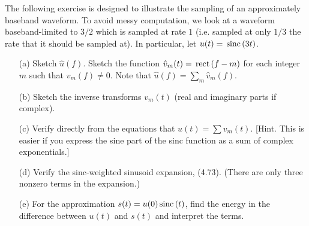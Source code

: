 \documentclass{assignment}
\begin{document}
\begin{prob}[4.35 Aliasing]
    The following exercise is designed to illustrate the sampling of an approximately baseband waveform. To avoid messy computation, we look at a waveform baseband-limited to $3/2$ which is sampled at rate $1$ (i.e. sampled at only $1/3$ the rate that it should be sampled at). In particular, let $u(t)=\,\text{sinc}\,(3t)$.
    \begin{itemize}
        \item[(a)] Sketch $\hat{u}(f)$. Sketch the function $\hat{v}_m(t)=\,\text{rect}\,(f-m)$ for each integer $m$ such that $v_m(f)\neq 0$. Note that $\hat{u}(f)=\sum_m\hat{v}_m(f)$.
        \item[(b)] Sketch the inverse transforms $v_m(t)$ (real and imaginary parts if complex).
        \item[(c)] Verify directly from the equations that $u(t)=\sum v_m(t)$. [Hint. This is easier if you express the sine part of the sinc function as a sum of complex exponentials.]
        \item[(d)] Verify the sinc-weighted sinusoid expansion, (4.73). (There are only three nonzero terms in the expansion.)
        \item[(e)] For the approximation $s(t)=u(0)\,\text{sinc}\,(t)$, find the energy in the difference between $u(t)$ and $s(t)$ and interpret the terms.
    \end{itemize}
\end{prob}
\begin{sol}
\end{sol}
\end{document}
